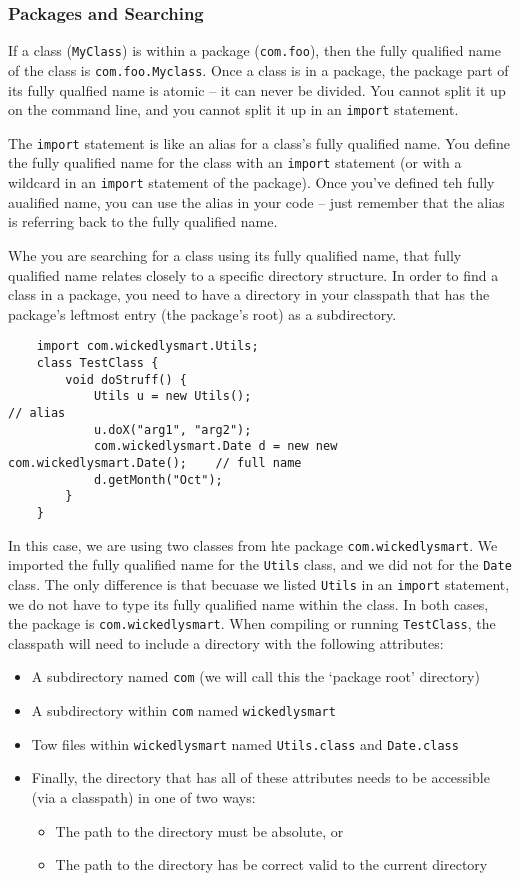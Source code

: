\subsubsection{Packages and Searching}
If a class (\verb#MyClass#) is within a package (\verb#com.foo#), then the 
fully qualified name of the class is \verb#com.foo.Myclass#. Once a class is in 
a package, the package part of its fully qualfied name is atomic -- it can 
never be divided. You cannot split it up on the command line, and you cannot 
split it up in an \verb#import# statement.

The \verb#import# statement is like an alias for a class's fully qualified 
name. You define the fully qualified name for the class with an \verb#import# 
statement (or with a wildcard in an \verb#import# statement of the package).  
Once you've defined teh fully aualified name, you can use the alias in your 
code -- just remember that the alias is referring back to the fully qualified 
name.

Whe you are searching for a class using its fully qualified name, that fully 
qualified name relates closely to a specific directory structure. In order to 
find a class in a package, you need to have a directory in your classpath that 
has the package's leftmost entry (the package's root) as a subdirectory.
\begin{verbatim}
    import com.wickedlysmart.Utils;
    class TestClass {
        void doStruff() {
            Utils u = new Utils();                                          // alias
            u.doX("arg1", "arg2");
            com.wickedlysmart.Date d = new new com.wickedlysmart.Date();    // full name
            d.getMonth("Oct");
        }
    }
\end{verbatim}
In this case, we are using two classes from hte package 
\verb#com.wickedlysmart#. We imported the fully qualified name for the 
\verb#Utils# class, and we did not for the \verb#Date# class. The only 
difference is that becuase we listed \verb#Utils# in an \verb#import# 
statement, we do not have to type its fully qualified name within the class. In 
both cases, the package is \verb#com.wickedlysmart#. When compiling or running 
\verb#TestClass#, the classpath will need to include a directory with the 
following attributes:
\begin{itemize}
    \item A subdirectory named \verb#com# (we will call this the `package root' 
    directory)
    \item A subdirectory within \verb#com# named \verb#wickedlysmart#
    \item Tow files within \verb#wickedlysmart# named \verb#Utils.class# and 
    \verb#Date.class#
    \item Finally, the directory that has all of these attributes needs to be 
    accessible (via a classpath) in one of two ways:
    \begin{itemize}
        \item The path to the directory must be absolute, or
        \item The path to the directory has be correct valid to the current 
        directory
    \end{itemize}
\end{itemize}

